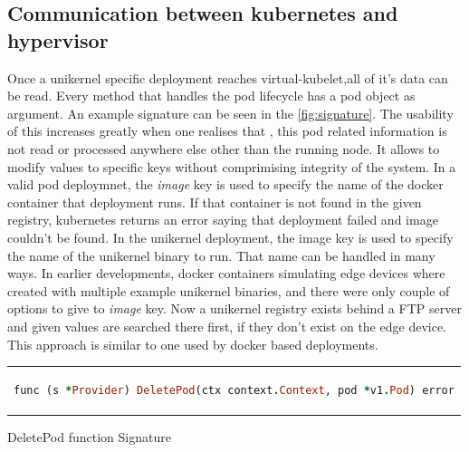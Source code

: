 \subsection{Communication between kubernetes and hypervisor}
Once a unikernel specific deployment reaches virtual-kubelet,all of it's data can be read. Every method that handles the pod lifecycle has a pod object as argument. An example signature can be seen in the \ref{fig:signature}. The usability of this increases greatly when one realises that , this pod related information is not read or processed anywhere else other than the running node. It allows to modify values to specific keys without comprimising integrity of the system. In a valid pod deploymnet, the \textit{image} key is used to specify the name of the docker container that deployment runs. If that container is not found in the given registry, kubernetes returns an error saying that deployment failed and image couldn't be found. In the unikernel deployment, the image key is used to specify the name of the unikernel binary to run. That name can be handled in many ways. In earlier developments, docker containers simulating edge devices where created with multiple example unikernel binaries, and there were only couple of options to give to \textit{image} key. Now a unikernel registry exists behind a FTP server and given values are searched there first, if they don't exist on the edge device. This approach is similar to one used by docker based deployments.

\begin{code}[htpb]
  \centering
  \begin{tabular}{c}
  \begin{lstlisting}[language=ruby]
    func (s *Provider) DeletePod(ctx context.Context, pod *v1.Pod) error
\end{lstlisting}
\end{tabular}
\caption{DeletePod function Signature}\label{fig:signature}
\end{code}

